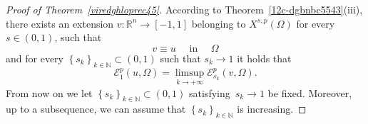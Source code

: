 \documentclass[12pt]{article}
\newcommand{\R}{\mathbb{R}}
\newcommand{\N}{\mathbb{N}}
\numberwithin{equation}{section}
\begin{document}
\begin{proof}[Proof of Theorem~\ref{viredghloprec45}]
According to Theorem~\ref{12c-dgbnbc5543}(iii), there exists an extension $v:\R^n\to [-1,1]$ belonging to $X^{s,p}(\Omega)$ for every $s\in(0,1)$, such that
\begin{equation}\label{servcloybegr}
v\equiv u \quad\mbox{  in  }\quad \Omega
\end{equation}
and for every $\left\lbrace s_k \right\rbrace_{k\in\N}\subset (0,1)$  such that $s_k\to 1$ it holds that
\begin{equation}\label{erre0}
\mathcal{E}_1^p(u,\Omega)=\limsup_{k\to+\infty}\mathcal{E}_{s_k}^p(v,\Omega).   
\end{equation} 
From now on we let $\left\lbrace s_{k} \right\rbrace_{k\in\N}\subset(0,1)$ satisfying~$s_k\to 1$ be fixed. Moreover, up to a subsequence, we can assume that $\left\lbrace s_k \right\rbrace_{k\in\N}$ is increasing. 


\end{proof}
\end{document}
